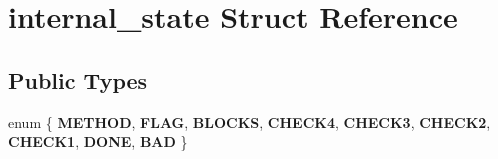 \hypertarget{structinternal__state}{}\section{internal\+\_\+state Struct Reference}
\label{structinternal__state}
\subsection*{Public Types}
\begin{DoxyCompactItemize}
\item 
\mbox{\label{structinternal__state_a2258ed040741b714a2b64cb4fe78856f}} 
enum \{ \newline
{\bfseries M\+E\+T\+H\+OD}, 
{\bfseries F\+L\+AG}, 
{\bfseries B\+L\+O\+C\+KS}, 
{\bfseries C\+H\+E\+C\+K4}, 
\newline
{\bfseries C\+H\+E\+C\+K3}, 
{\bfseries C\+H\+E\+C\+K2}, 
{\bfseries C\+H\+E\+C\+K1}, 
{\bfseries D\+O\+NE}, 
\newline
{\bfseries B\+AD}
 \}
\end{DoxyCompactItemize}
